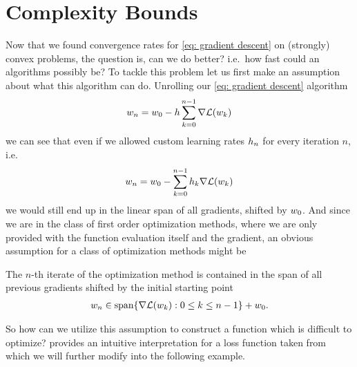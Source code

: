 \section{Complexity Bounds}\label{sec: complexity bounds}

Now that we found convergence rates for \ref{eq: gradient descent} on (strongly) convex
problems, the question is, can we do better? i.e.\ how fast could an algorithms
possibly be? To tackle this problem let us first make an assumption about what
this algorithm can do. Unrolling our \ref{eq: gradient descent} algorithm
%
\begin{align*}
	w_n = w_0 - h\sum_{k=0}^{n-1} \nabla \mathcal{L}(w_k)
\end{align*}
%
we can see that even if we allowed custom learning rates \(h_n\) for every
iteration \(n\), i.e.
%
\begin{align*}
	w_n = w_0 - \sum_{k=0}^{n-1} h_k \nabla \mathcal{L}(w_k)
\end{align*}
%
we would still end up in the linear span of all gradients, shifted by \(w_0\).
And since we are in the class of first order optimization methods, where we are
only provided with the function evaluation itself and the gradient, an obvious
assumption for a class of optimization methods might be
%
\begin{assumption}
	\label{assmpt: parameter in linear hull of gradients}
	The \(n\)-th iterate of the optimization method is contained in the span of all
	previous gradients shifted by the initial starting point
	\begin{align*}
		w_n \in \text{span}\{\nabla \mathcal{L}(w_k) : 0\le k \le n-1\} + w_0.
	\end{align*}
\end{assumption}
%
So how can we utilize this assumption to construct a function which is difficult to
optimize?  \textcite{gohWhyMomentumReally2017} provides an intuitive
interpretation for a loss function taken from \textcite[Section
2.1.2]{nesterovLecturesConvexOptimization2018} which we will further modify into
the following example.

